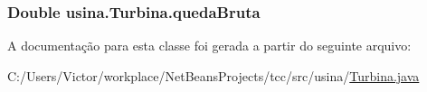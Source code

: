 \hypertarget{classusina_1_1_turbina_a74ca99529c8c56c1ffddba8bc914c442}{
\subsubsection[{queda\-Bruta}]{\setlength{\rightskip}{0pt plus 5cm}Double usina.\-Turbina.\-queda\-Bruta\hspace{0.3cm}{\ttfamily [private]}}}\label{classusina_1_1_turbina_a74ca99529c8c56c1ffddba8bc914c442}


A documentação para esta classe foi gerada a partir do seguinte arquivo\-:\begin{DoxyCompactItemize}
\item 
C\-:/\-Users/\-Victor/workplace/\-Net\-Beans\-Projects/tcc/src/usina/\hyperlink{_turbina_8java}{Turbina.\-java}\end{DoxyCompactItemize}
